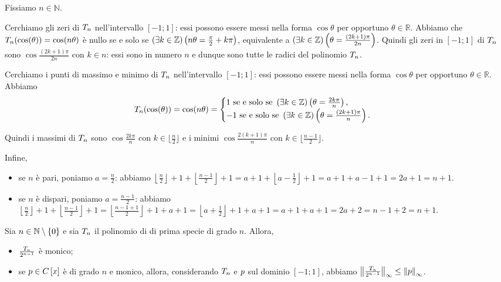 \Proof Fissiamo $n \in \mathbb{N}$.
\par Cerchiamo gli zeri di $T_n$ nell'intervallo $[-1;1]$: essi possono essere messi nella forma $\cos{\theta}$ per opportuno $\theta \in \mathbb{R}$. Abbiamo che $T_n(\cos(\theta)) = \cos(n \theta)$ \`e nullo se e solo se $\left ( \exists k \in \mathbb{Z} \right ) \left ( n \theta = \frac{\pi}{2} + k\pi \right )$, equivalente a $\left ( \exists k \in \mathbb{Z} \right ) \left ( \theta = \frac{(2k + 1)\pi}{2n} \right )$. Quindi gli zeri in $[-1;1]$ di $T_n$ sono $\cos \frac{(2k + 1)\pi}{2n}$ con $k \in n$: essi sono in numero $n$ e dunque sono tutte le radici del polinomio $T_n$.
\par Cerchiamo i punti di massimo e minimo di $T_n$ nell'intervallo $[-1;1]$: essi possono essere messi nella forma $\cos{\theta}$ per opportuno $\theta \in \mathbb{R}$. Abbiamo
\[
	T_n(\cos(\theta)) = \cos(n \theta) =
	\begin{cases}
		1\text{ se e solo se }\left ( \exists k \in \mathbb{Z} \right ) \left ( \theta = \frac{2k\pi}{n} \right ),\\
		- 1\text{ se e solo se }\left ( \exists k \in \mathbb{Z} \right ) \left ( \theta = \frac{(2k + 1)\pi}{n} \right ).
	\end{cases}
\]
\par Quindi i massimi di $T_n$ sono $\cos \frac{2k\pi}{n}$ con $k \in \lfloor \frac{n}{2} \rfloor$ e i minimi $\cos \frac{2(k + 1)\pi}{n}$ con $k \in \lfloor \frac{n - 1}{2} \rfloor$.
\par Infine,
\begin{itemize}
	\item se $n$ \`e pari, poniamo $a = \frac{n}{2}$: abbiamo $\left \lfloor \frac{n}{2} \right \rfloor + 1 + \left \lfloor \frac{n - 1}{2} \right \rfloor  + 1 = a + 1 + \left \lfloor a - \frac{1}{2} \right \rfloor + 1 = a + 1 + a - 1 + 1= 2a + 1 = n + 1$.
	\item se $n$ \`e dispari, poniamo $a = \frac{n - 1}{2}$: abbiamo $\left \lfloor \frac{n}{2} \right \rfloor + 1 + \left \lfloor \frac{n - 1}{2} \right \rfloor  + 1 = \left \lfloor \frac{n - 1 + 1}{2} \right \rfloor + 1 + a + 1 = \left \lfloor a + \frac{1}{2} \right \rfloor + 1 + a + 1 = a + 1 + a + 1 = 2a + 2 = n - 1 + 2 = n + 1$. \EndProof 
\end{itemize}
\begin{Theorem}
	Sia $n \in \mathbb{N} \setminus \lbrace 0 \rbrace$ e sia $T_n$ il polinomio di \Chebyshev di prima specie di grado $n$. Allora,
	\begin{itemize}
		\item $\frac{T_n}{2^{n - 1}}$ \`e monico;
		\item se $p \in C \left [ x \right ]$ \`e di grado $n$ e monico, allora, considerando $T_n$ e $p$ sul dominio $[-1;1]$, abbiamo $\Norm{\frac{\FirstChebyshevPolynomial_n}{2^{n - 1}}}[\infty] \leq \Norm{\Polynomial}[\infty]$.
	\end{itemize}
\end{Theorem}
